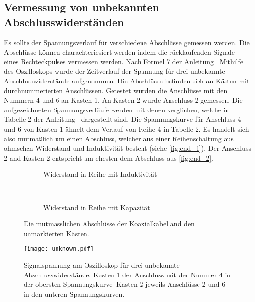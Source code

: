 \subsection{Vermessung von unbekannten Abschlusswiderständen}
Es sollte der Spannungsverlauf für verschiedene Abschlüsse gemessen werden. Die Abschlüsse können charachteriesiert werden indem die rücklaufenden
Signale eines Rechteckpulses vermessen werden. Nach Formel 7 der Anleitung~\cite{v52}
Mithilfe des Oszilloskops wurde der Zeitverlauf der Spannung für drei unbekannte Abschlusswiderstände aufgenommen.
Die Abschlüsse befinden sich an Kästen mit durchnummerierten Anschlüssen.
Getestet wurden die Anschlüsse mit den Nummern 4 und 6 an Kasten 1. An Kasten 2 wurde Anschluss 2 gemessen.
Die aufgezeichneten Spannungsverläufe werden mit denen verglichen, welche in Tabelle 2 der Anleitung~\cite{v52} dargestellt sind.
Die Spannungskurve für Anschluss 4 und 6 von Kasten 1 ähnelt dem Verlauf von Reihe 4 in Tabelle 2.
Es handelt sich also mutmaßlich um einen Abschluss, welcher aus einer Reihenschaltung aus ohmschen Widerstand und Induktivität besteht (siehe
\autoref{fig:end_1}).
Der Anschluss 2 and Kasten 2 entspricht am ehesten dem Abschluss aus \autoref{fig:end_2}.

\begin{figure}
    \centering
    \begin{subfigure}[b]{0.45\textwidth}
      \centering
        
        \caption{Widerstand in Reihe mit Induktivität}
        \label{fig:end_1}
    \end{subfigure}
    ~ %
    \begin{subfigure}[b]{0.45\textwidth}
        \centering
        
        \caption{Widerstand in Reihe mit Kapazität}
        \label{fig:end_2}
    \end{subfigure}
    \caption{Die mutmasslichen Abschlüsse der Koaxialkabel and den unmarkierten Kästen.}\label{fig:ends}
\end{figure}


\begin{figure}
  \centering
  \texttt{[image: unknown.pdf]}
  \caption{%
    Signalspannung am Oszilloskop für drei unbekannte Abschlusswiderstände.
    Kasten 1 der Anschluss mit der Nummer 4 in der obersten Spannungskurve. Kasten 2 jeweils Anschlüsse 2 und 6 in den
    unteren Spannungskurven.
  }\label{fig:unknown}
\end{figure}



